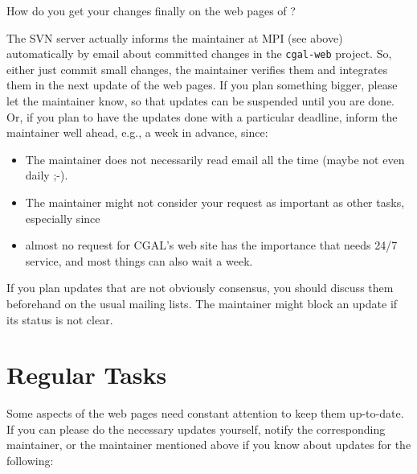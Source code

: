 How do you get your changes finally on the web pages of \cgal?

The SVN server actually informs the maintainer at MPI (see above)
automatically by email about committed changes in the
\texttt{cgal-web} project. So, either just commit small changes, the
maintainer verifies them and integrates them in the next update of the
web pages. If you plan something bigger, please let the maintainer
know, so that updates can be suspended until you are done.  Or, if you
plan to have the updates done with a particular deadline, inform the
maintainer well ahead, e.g., a week in advance, since:

\begin{itemize}
    \item
        The maintainer does not necessarily read email all the time
        (maybe not even daily ;-).
    \item
        The maintainer might not consider your request as important as
        other tasks, especially since
    \item
        almost no request for CGAL's web site has the importance that needs
        24/7 service, and most things can also wait a week.
\end{itemize}

If you plan updates that are not obviously consensus, you should discuss them
beforehand on the usual mailing lists. The maintainer might block an
update if its status is not clear.


\section{Regular Tasks}

Some aspects of the web pages need constant attention to keep them
up-to-date. If you can please do the necessary updates yourself,
notify the corresponding maintainer, or the maintainer mentioned above
if you know about updates for the following:

